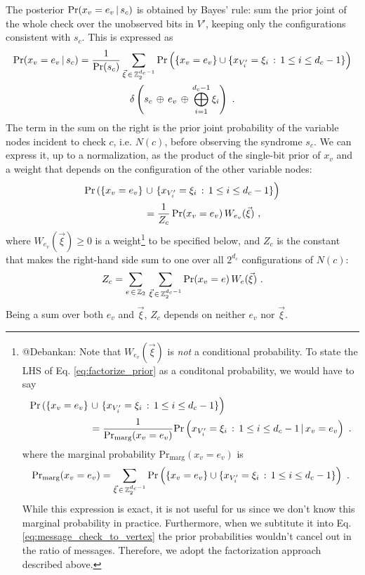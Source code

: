 \documentclass{article}
\def\ts{\thinspace}
\def\P{\text{Pr}}
\begin{document}
The posterior $\P(x_{v} = e_{v} \ts|\ts s_{c})$ is obtained by Bayes' rule: sum the prior joint of the whole check over the unobserved bits in $V'$, keeping only the configurations consistent with $s_c$. This is expressed as
\begin{multline}
    \P(x_{v} = e_{v} \ts|\ts s_{c}) = \dfrac{1}{\P(s_c)} \sum_{\vec{\xi} \ts\in\ts \mathbb{Z}_{2}^{d_{c} - 1}} \P\left(\{x_{v} = e_{v}\}\cup\{x_{V^{\prime}_{i}} = \xi_{i}\ts:\ts 1\leq i\leq d_{c} - 1\}\right) \\
    \delta\left(s_c \ts\oplus\ts e_v \ts\oplus\ts \bigoplus_{i=1}^{d_c-1} \xi_i\right) ~. \label{eq:prob_var_zero}
\end{multline}
The term in the sum on the right is the prior joint probability of the variable nodes incident to check $c$, i.e. $N(c)$, before observing the syndrome $s_c$. We can express it, up to a normalization, as the product of the single-bit prior of $x_v$ and a weight that depends on the configuration of the other variable nodes:
\begin{align}
    \P\left(\{x_{v} = e_{v}\}\right.&\cup\left.\{x_{V^{\prime}_{i}} = \xi_{i}\ts:\ts 1\leq i\leq d_{c} - 1\}\right) \nonumber \\
    &= \dfrac{1}{Z_{c}}\ts\P(x_v = e_v)\ts W_{e_v}(\vec{\xi}) ~, \label{eq:factorize_prior}
\end{align}
where $W_{e_v}(\vec{\xi}) \geq 0$ is a weight\footnote{@Debankan: Note that $W_{e_v}(\vec{\xi})$ is \emph{not} a conditional probability. To state the LHS of Eq. \ref{eq:factorize_prior} as a conditonal probability, we would have to say
\begin{align}
\P\left(\{x_{v} = e_{v}\}\right.&\cup\left.\{x_{V^{\prime}_{i}} = \xi_{i}\ts:\ts 1\leq i\leq d_{c} - 1\}\right) \nonumber \\
&= \dfrac{1}{\P_{\text{marg}}(x_v = e_v)} \P\left(x_{V^{\prime}_{i}} = \xi_{i}\ts:\ts 1\leq i\leq d_{c} - 1 \ts|\ts x_v = e_v\right) ~.
\end{align}
where the marginal probability $\P_{\text{marg}}(x_v = e_v)$ is
\begin{gather*}
\P_{\text{marg}}(x_v = e_v) = \sum_{\vec{\xi} \ts\in\ts \mathbb{Z}_{2}^{d_{c} - 1}} \P\left(\{x_{v} = e_{v}\}\cup\{x_{V^{\prime}_{i}} = \xi_{i}\ts:\ts 1\leq i\leq d_{c} - 1\}\right) ~.
\end{gather*}
While this expression is exact, it is not useful for us since we don't know this marginal probability in practice. Furthermore, when we subtitute it into Eq. \ref{eq:message_check_to_vertex} the prior probabilities wouldn't cancel out in the ratio of messages. Therefore, we adopt the factorization approach described above.
} to be specified below, and $Z_{c}$ is the constant that makes the right-hand side sum to one over all $2^{d_c}$ configurations of $N(c)$:
\begin{gather}
    Z_{c} = \sum_{e \ts\in\ts \mathbb{Z}_{2}} \ts \sum_{\vec{\xi} \ts\in\ts \mathbb{Z}_{2}^{d_{c} - 1}} \P(x_{v} = e)\ts W_{e}(\vec{\xi}) ~. \label{eq:def_Z_c}
\end{gather}
Being a sum over both $e_v$ and $\vec{\xi}$, $Z_c$ depends on neither $e_v$ nor $\vec{\xi}$.
\end{document}
